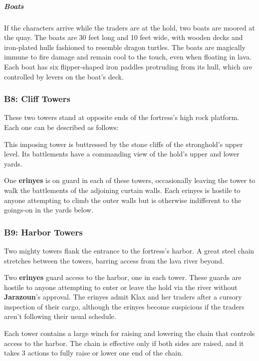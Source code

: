 \documentclass[10pt,a4paper,twoside,bg=print,twocolumn,openany,nodeprecatedcode]{dndbook}
\begin{document}
\subparagraph{Boats}
If the characters arrive while the traders are at the hold, two boats are moored at the quay. The boats are 30 feet long and 10 feet wide, with wooden decks and iron-plated hulls fashioned to resemble dragon turtles. The boats are magically immune to fire damage and remain cool to the touch, even when floating in lava. Each boat has six flipper-shaped iron paddles protruding from its hull, which are controlled by levers on the boat's deck.

\subsubsection{B8: Cliff Towers}
These two towers stand at opposite ends of the fortress's high rock platform. Each one can be described as follows:

\begin{DndReadAloud}{}
This imposing tower is buttressed by the stone cliffs of the stronghold's upper level. Its battlements have a commanding view of the hold's upper and lower yards.

\end{DndReadAloud}

One \textbf{erinyes} is on guard in each of these towers, occasionally leaving the tower to walk the battlements of the adjoining curtain walls. Each erinyes is hostile to anyone attempting to climb the outer walls but is otherwise indifferent to the goings-on in the yards below.

\subsubsection{B9: Harbor Towers}
\begin{DndReadAloud}{}
Two mighty towers flank the entrance to the fortress's harbor. A great steel chain stretches between the towers, barring access from the lava river beyond.

\end{DndReadAloud}

Two \textbf{erinyes} guard access to the harbor, one in each tower. These guards are hostile to anyone attempting to enter or leave the hold via the river without \textbf{Jarazoun}'s approval. The erinyes admit Klax and her traders after a cursory inspection of their cargo, although the erinyes become suspicious if the traders aren't following their usual schedule.

Each tower contains a large winch for raising and lowering the chain that controls access to the harbor. The chain is effective only if both sides are raised, and it takes 3 actions to fully raise or lower one end of the chain.
\end{document}
